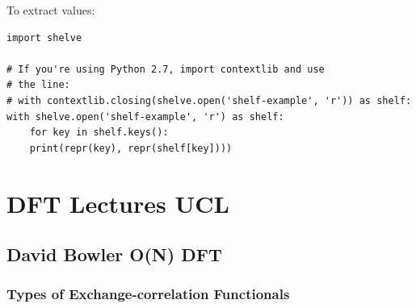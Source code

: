 \documentclass[11pt]{article}
\begin{document}
To extract values:
\begin{verbatim}
import shelve

# If you're using Python 2.7, import contextlib and use
# the line:
# with contextlib.closing(shelve.open('shelf-example', 'r')) as shelf:
with shelve.open('shelf-example', 'r') as shelf:
    for key in shelf.keys():
	print(repr(key), repr(shelf[key])))
\end{verbatim}

\section{DFT Lectures UCL}
\label{sec-3}
\subsection{David Bowler O(N) DFT}
\label{sec-3-1}
\subsubsection{Types of Exchange-correlation Functionals}
\label{sec-3-1-1}
\end{document}
